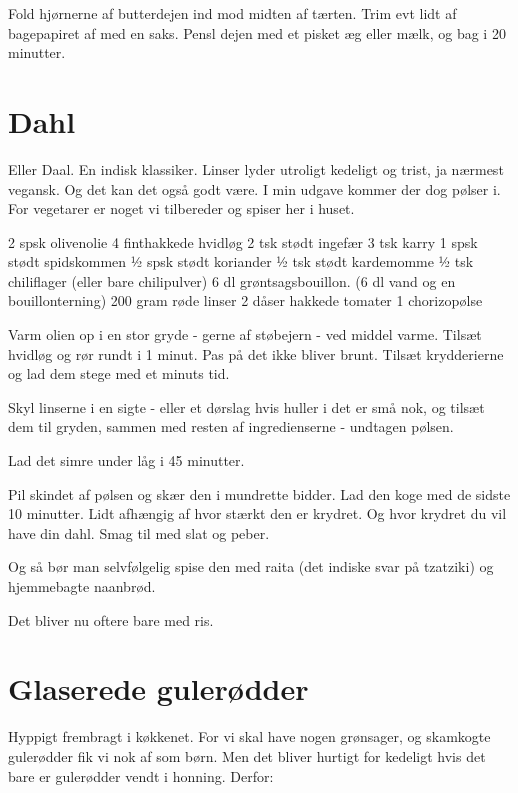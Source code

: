 \documentclass[
]{book}
\begin{document}
Fold hjørnerne af butterdejen ind mod midten af tærten. Trim
evt lidt af bagepapiret af med en saks. Pensl dejen
med et pisket æg eller mælk, og bag i 20 minutter.

\section{Dahl}\label{dahl-1}

Eller Daal. En indisk klassiker. Linser lyder utroligt kedeligt og trist, ja nærmest vegansk. Og det kan det også godt være. I min udgave kommer der dog pølser i. For vegetarer er noget vi tilbereder og spiser her i huset.

2 spsk olivenolie
4 finthakkede hvidløg
2 tsk stødt ingefær
3 tsk karry
1 spsk stødt spidskommen
½ spsk stødt koriander
½ tsk stødt kardemomme
½ tsk chiliflager (eller bare chilipulver)
6 dl grøntsagsbouillon. (6 dl vand og en bouillonterning)
200 gram røde linser
2 dåser hakkede tomater
1 chorizopølse

Varm olien op i en stor gryde - gerne af støbejern - ved middel varme. Tilsæt hvidløg og rør rundt i 1 minut. Pas på det ikke bliver brunt. Tilsæt krydderierne og lad dem stege med et minuts tid.

Skyl linserne i en sigte - eller et dørslag hvis huller i det er små nok, og tilsæt dem til gryden, sammen med resten af ingredienserne - undtagen pølsen.

Lad det simre under låg i 45 minutter.

Pil skindet af pølsen og skær den i mundrette bidder. Lad den koge med de sidste 10 minutter. Lidt afhængig af hvor stærkt den er krydret. Og hvor krydret du vil have din dahl. Smag til med slat og peber.

Og så bør man selvfølgelig spise den med raita (det indiske svar på tzatziki) og hjemmebagte naanbrød.

Det bliver nu oftere bare med ris.

\section{Glaserede gulerødder}\label{glaserede-guleruxf8dder}

Hyppigt frembragt i køkkenet. For vi skal have nogen grønsager, og skamkogte gulerødder fik vi nok af som børn. Men det bliver hurtigt for kedeligt hvis det bare er gulerødder vendt i honning. Derfor:
\end{document}
